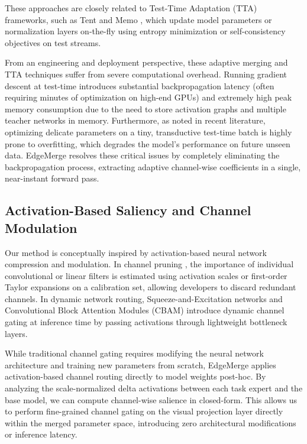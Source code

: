 These approaches are closely related to Test-Time Adaptation (TTA) frameworks, such as Tent \cite{wang2021tent} and Memo \cite{zhang2022memo}, which update model parameters or normalization layers on-the-fly using entropy minimization or self-consistency objectives on test streams.

From an engineering and deployment perspective, these adaptive merging and TTA techniques suffer from severe computational overhead. Running gradient descent at test-time introduces substantial backpropagation latency (often requiring minutes of optimization on high-end GPUs) and extremely high peak memory consumption due to the need to store activation graphs and multiple teacher networks in memory. Furthermore, as noted in recent literature, optimizing delicate parameters on a tiny, transductive test-time batch is highly prone to overfitting, which degrades the model's performance on future unseen data. EdgeMerge resolves these critical issues by completely eliminating the backpropagation process, extracting adaptive channel-wise coefficients in a single, near-instant forward pass.

\subsection{Activation-Based Saliency and Channel Modulation}
Our method is conceptually inspired by activation-based neural network compression and modulation. In channel pruning \cite{he2017channel, li2016pruning, molchanov2016pruning}, the importance of individual convolutional or linear filters is estimated using activation scales or first-order Taylor expansions on a calibration set, allowing developers to discard redundant channels. In dynamic network routing, Squeeze-and-Excitation networks \cite{hu2018squeeze} and Convolutional Block Attention Modules (CBAM) \cite{woo2018cbam} introduce dynamic channel gating at inference time by passing activations through lightweight bottleneck layers.

While traditional channel gating requires modifying the neural network architecture and training new parameters from scratch, EdgeMerge applies activation-based channel routing directly to model weights post-hoc. By analyzing the scale-normalized delta activations between each task expert and the base model, we can compute channel-wise salience in closed-form. This allows us to perform fine-grained channel gating on the visual projection layer directly within the merged parameter space, introducing zero architectural modifications or inference latency.
